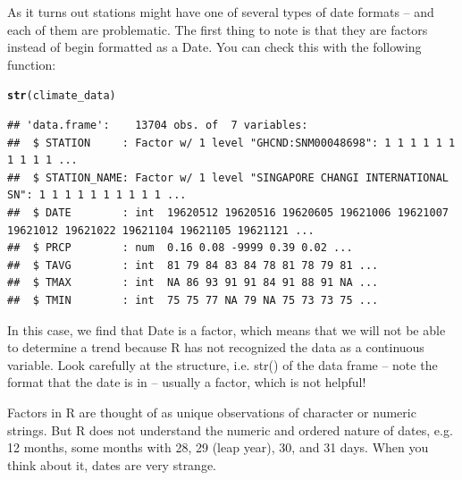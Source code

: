 \documentclass{article}\usepackage[]{graphicx}\usepackage[]{color}
\makeatletter
\newcommand{\hlstd}[1]{\textcolor[rgb]{0.345,0.345,0.345}{#1}}%
\newcommand{\hlkwd}[1]{\textcolor[rgb]{0.737,0.353,0.396}{\textbf{#1}}}%
\newenvironment{kframe}{%
 \def\at@end@of@kframe{}%
 \ifinner\ifhmode%
  \def\at@end@of@kframe{\end{minipage}}%
  \begin{minipage}{\columnwidth}%
 \fi\fi%
 \def\FrameCommand##1{\hskip\@totalleftmargin \hskip-\fboxsep
 \colorbox{shadecolor}{##1}\hskip-\fboxsep
     \hskip-\linewidth \hskip-\@totalleftmargin \hskip\columnwidth}%
 \MakeFramed {\advance\hsize-\width
   \@totalleftmargin\z@ \linewidth\hsize
   \@setminipage}}%
 {\par\unskip\endMakeFramed%
 \at@end@of@kframe}
\newenvironment{knitrout}{}{} %
\makeatother
\begin{document}



As it turns out stations might have one of several types of date formats -- and each of them are problematic. The first thing to note is that they are factors instead of begin formatted as a Date. You can check this with the following function:

\begin{knitrout}
\color{fgcolor}\begin{kframe}
\begin{alltt}
\hlkwd{str}\hlstd{(climate_data)}
\end{alltt}
\begin{verbatim}
## 'data.frame':	13704 obs. of  7 variables:
##  $ STATION     : Factor w/ 1 level "GHCND:SNM00048698": 1 1 1 1 1 1 1 1 1 1 ...
##  $ STATION_NAME: Factor w/ 1 level "SINGAPORE CHANGI INTERNATIONAL SN": 1 1 1 1 1 1 1 1 1 1 ...
##  $ DATE        : int  19620512 19620516 19620605 19621006 19621007 19621012 19621022 19621104 19621105 19621121 ...
##  $ PRCP        : num  0.16 0.08 -9999 0.39 0.02 ...
##  $ TAVG        : int  81 79 84 83 84 78 81 78 79 81 ...
##  $ TMAX        : int  NA 86 93 91 91 84 91 88 91 NA ...
##  $ TMIN        : int  75 75 77 NA 79 NA 75 73 73 75 ...
\end{verbatim}
\end{kframe}
\end{knitrout}

In this case, we find that Date is a factor, which means that we will not be able to determine a trend because R has not recognized the data as a continuous variable. Look carefully at the structure, i.e. str() of the data frame -- note the format that the date is in -- usually a factor, which is not helpful!  

Factors in R are thought of as unique observations of character or numeric strings. But R does not understand the numeric and ordered nature of dates, e.g. 12 months, some months with 28, 29 (leap year), 30, and 31 days. When you think about it, dates are very strange. 
\end{document}

